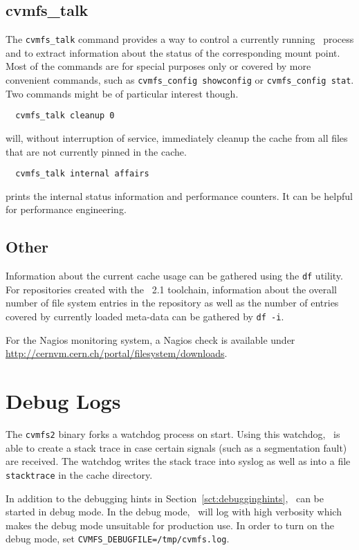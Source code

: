 \subsection{cvmfs\_talk}
The \texttt{cvmfs\_talk} command provides a way to control a currently running \cvmfs\ process and to extract information about the status of the corresponding mount point.
Most of the commands are for special purposes only or covered by more convenient commands, such as \texttt{cvmfs\_config showconfig} or \texttt{cvmfs\_config stat}.
Two commands might be of particular interest though.
\begin{verbatim}
  cvmfs_talk cleanup 0
\end{verbatim}
will, without interruption of service, immediately cleanup the cache from all files that are not currently pinned in the cache.
\begin{verbatim}
  cvmfs_talk internal affairs
\end{verbatim}
prints the internal status information and performance counters.
It can be helpful for performance engineering.

\subsection{Other}
Information about the current cache usage can be gathered using the \texttt{df} utility.
For repositories created with the \cvmfs\ 2.1 toolchain, information about the overall number of file system entries in the repository as well as the number of entries covered by currently loaded meta-data can be gathered by \texttt{df -i}.

For the Nagios monitoring system, a Nagios check is available under \url{http://cernvm.cern.ch/portal/filesystem/downloads}.

\section{Debug Logs}
The \texttt{cvmfs2} binary forks a watchdog process on start.
Using this watchdog, \cvmfs\ is able to create a stack trace in case certain signals (such as a segmentation fault) are received.
The watchdog writes the stack trace into syslog as well as into a file \texttt{stacktrace} in the cache directory.

In addition to the debugging hints in Section~\ref{sct:debugginghints}, \cvmfs\ can be started in debug mode.
In the debug mode, \cvmfs\ will log with high verbosity which makes the debug mode unsuitable for production use.
In order to turn on the debug mode, set \texttt{CVMFS\_DEBUGFILE=/tmp/cvmfs.log}.

